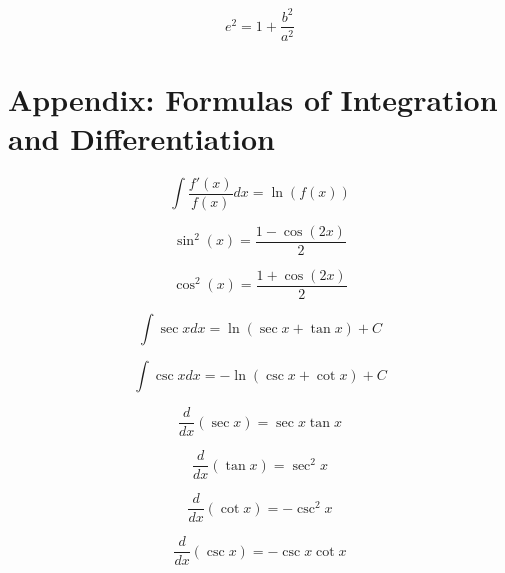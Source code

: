 \documentclass[a4paper,9pt]{scrartcl}
\begin{document}
    \begin{displaymath}
        e^2 = 1 + \frac{b^2}{a^2}
    \end{displaymath}


    \section{Appendix: Formulas of Integration and Differentiation}

    \begin{displaymath}
        \int \frac{f'(x)}{f(x)} dx = \ln(f(x))
    \end{displaymath}

    \begin{displaymath}
        \sin^2(x) = \frac{1-\cos(2x)}{2}
    \end{displaymath}

    \begin{displaymath}
        \cos^2(x) = \frac{1+\cos(2x)}{2}
    \end{displaymath}

    \begin{displaymath}
        \int{\sec{x}}dx = \ln{(\sec{x} + \tan{x})} + C
    \end{displaymath}

    \begin{displaymath}
        \int{\csc{x}}dx = -\ln({\csc{x} + \cot{x}}) + C
    \end{displaymath}

    \begin{displaymath}
        \frac{d}{dx}(\sec{x}) = \sec{x}\tan{x}
    \end{displaymath}

    \begin{displaymath}
        \frac{d}{dx}(\tan{x}) = \sec^2{x}
    \end{displaymath}

    \begin{displaymath}
        \frac{d}{dx}(\cot{x}) = -\csc^2{x}
    \end{displaymath}

    \begin{displaymath}
        \frac{d}{dx}(\csc{x}) = -\csc{x}\cot{x}
    \end{displaymath}
\end{document}
